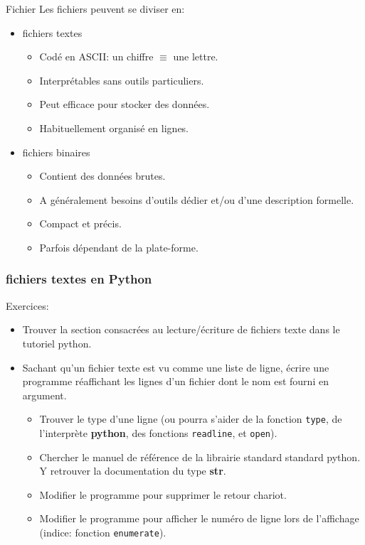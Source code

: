 \documentclass{beamer}
\begin{document}
\begin{frame}{Fichier}
  Les fichiers peuvent se diviser en:
  \begin{itemize}
    \item fichiers textes
      \begin{itemize}
      \item Codé en ASCII: un chiffre $\equiv$ une lettre.
      \item Interprétables sans outils particuliers.
      \item Peut efficace pour stocker des données.
      \item Habituellement organisé en lignes.
      \end{itemize}
    \item fichiers binaires
      \begin{itemize}
      \item Contient des données brutes.
      \item A généralement besoins d'outils dédier et/ou d'une description formelle.
      \item Compact et précis.
      \item Parfois dépendant de la plate-forme.
      \end{itemize}
  \end{itemize}
\end{frame}

\begin{frame}[fragile]\frametitle{fichiers textes en Python}
  Exercices:
  \begin{itemize}
  \item Trouver la section consacrées au lecture/écriture de fichiers texte dans le tutoriel python.
  \item Sachant qu'un fichier texte est vu comme une liste de ligne, écrire une programme réaffichant les lignes d'un fichier dont le nom est fourni en argument.
    \begin{itemize}
    \item Trouver le type d'une ligne (ou pourra s'aider de la fonction {\tt type}, de l'interprète {\bf python}, des fonctions {\tt readline}, et {\tt open}).
    \item Chercher le manuel de référence de la librairie standard standard python. Y retrouver la documentation du type {\bf str}.
    \item Modifier le programme pour supprimer le retour chariot.
    \item Modifier le programme pour afficher le numéro de ligne lors de l'affichage (indice: fonction {\tt enumerate}).
    \end{itemize}
  \end{itemize}
\end{frame}
\end{document}
